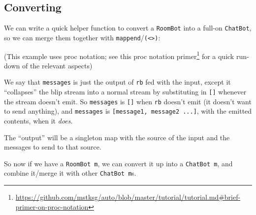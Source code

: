 \documentclass[]{article}
\newenvironment{Shaded}{}{}
\newcommand{\CommentTok}[1]{\textcolor[rgb]{0.38,0.63,0.69}{\textit{#1}}}
\newcommand{\DataTypeTok}[1]{\textcolor[rgb]{0.56,0.13,0.00}{#1}}
\newcommand{\FunctionTok}[1]{\textcolor[rgb]{0.02,0.16,0.49}{#1}}
\newcommand{\KeywordTok}[1]{\textcolor[rgb]{0.00,0.44,0.13}{\textbf{#1}}}
\newcommand{\NormalTok}[1]{#1}
\newcommand{\OperatorTok}[1]{\textcolor[rgb]{0.40,0.40,0.40}{#1}}
\newcommand{\OtherTok}[1]{\textcolor[rgb]{0.00,0.44,0.13}{#1}}
\renewcommand{\href}[2]{#2\footnote{\url{#1}}}
\begin{document}
\subsection{Converting}\label{converting}

We can write a quick helper function to convert a \texttt{RoomBot} into a
full-on \texttt{ChatBot}, so we can merge them together with
\texttt{mappend}/\texttt{(\textless{}\textgreater{})}:

\begin{Shaded}
\end{Shaded}

(This example uses proc notation; see this
\href{https://github.com/mstksg/auto/blob/master/tutorial/tutorial.md\#brief-primer-on-proc-notation}{proc
notation primer} for a quick run-down of the relevant aspects)

We say that \texttt{messages} is just the output of \texttt{rb} fed with the
input, except it ``collapses'' the blip stream into a normal stream by
substituting in \texttt{{[}{]}} whenever the stream doesn't emit. So
\texttt{messages} is \texttt{{[}{]}} when \texttt{rb} doesn't emit (it doesn't
want to send anything), and \texttt{messages} is
\texttt{{[}message1,\ message2\ ...{]}}, with the emitted contents, when it
\emph{does}.

The ``output'' will be a singleton map with the source of the input and the
messages to send to that source.

So now if we have a \texttt{RoomBot\ m}, we can convert it up into a
\texttt{ChatBot\ m}, and combine it/merge it with other \texttt{ChatBot\ m}s.
\end{document}
